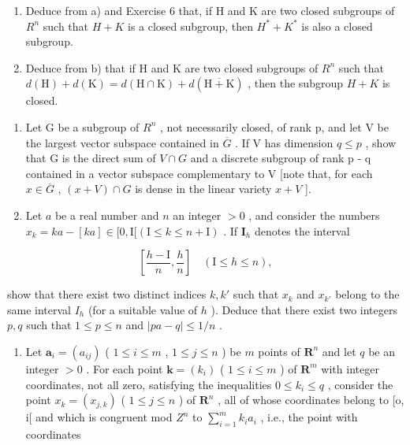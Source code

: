 \begin{enumerate}
\def\labelenumi{\alph{enumi})}
\setcounter{enumi}{1}
\item
  Deduce from a) and Exercise 6 that, if H and K are two closed subgroups of \(R^{n}\) such that \(H + K\) is a closed subgroup, then \(H^{*} + K^{*}\) is also a closed subgroup.
\item
  Deduce from b) that if H and K are two closed subgroups of \(R^{n}\) such that \(d(\mathrm{H}) + d(\mathrm{K}) = d(\mathrm{H} \cap \mathrm{K}) + d(\overline{\mathrm{H} + \mathrm{K}})\) , then the subgroup \(H + K\) is closed.
\end{enumerate}

\begin{enumerate}
\def\labelenumi{\arabic{enumi})}
\setcounter{enumi}{8}
\item
  Let G be a subgroup of \(R^{n}\) , not necessarily closed, of rank p, and let V be the largest vector subspace contained in \(\overline{G}\) . If V has dimension \(q \leqslant p\) , show that G is the direct sum of \(V \cap G\) and a discrete subgroup of rank p - q contained in a vector subspace complementary to V {[}note that, for each \(x \in \overline{G}\) , \((x + V) \cap G\) is dense in the linear variety \(x + V\) {]}.
\item
  Let \(a\) be a real number and \(n\) an integer \(>0\) , and consider the numbers \(x_{k} = ka - [ka] \in [0, \mathrm{I}[(\mathrm{I} \leqslant k \leqslant n + \mathrm{I})\) . If \(\mathbf{I}_h\) denotes the interval
\end{enumerate}

\[
\left[ \frac {h - \mathrm{I}}{n}, \frac {h}{n} \right] \quad (\mathrm{I} \leqslant h \leqslant n),
\]

show that there exist two distinct indices \(k, k'\) such that \(x_k\) and \(x_{k'}\) belong to the same interval \(I_h\) (for a suitable value of \(h\) ). Deduce that there exist two integers \(p, q\) such that \(1 \leqslant p \leqslant n\) and \(|pa - q| \leqslant 1 / n\) .

\begin{enumerate}
\def\labelenumi{\Roman{enumi})}
\setcounter{enumi}{1}
\tightlist
\item
  Let \(\boldsymbol{a}_i = (a_{ij})\) ( \(1 \leqslant i \leqslant m\) , \(1 \leqslant j \leqslant n\) ) be \(m\) points of \(\mathbf{R}^n\) and let \(q\) be an integer \(>0\) . For each point \(\boldsymbol{k} = (k_i)\) ( \(1 \leqslant i \leqslant m\) ) of \(\mathbf{R}^m\) with integer coordinates, not all zero, satisfying the inequalities \(0 \leqslant k_i \leqslant q\) , consider the point \(x_k = (x_{j,k})\) ( \(1 \leqslant j \leqslant n\) ) of \(\mathbf{R}^n\) , all of whose coordinates belong to {[}o, i{[} and which is congruent mod \(Z^n\) to \(\sum_{i=1}^{m} k_i a_i\) , i.e., the point with coordinates
\end{enumerate}

